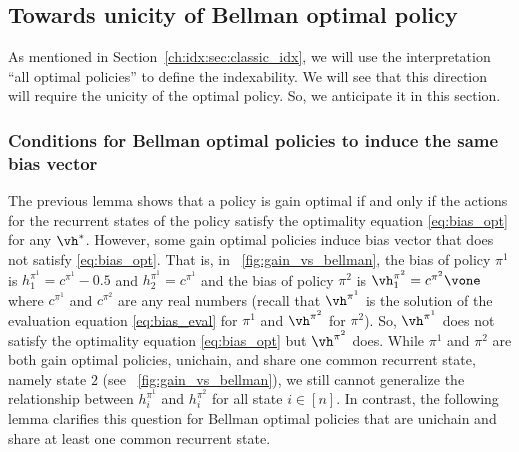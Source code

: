 \subsection{Towards unicity of Bellman optimal policy}
\label{ch:idx:ssec:prop_bell_opt}

As mentioned in Section~\ref{ch:idx:sec:classic_idx}, we will use the interpretation ``all optimal policies'' to define the indexability.
We will see that this direction will require the unicity of the optimal policy.
So, we anticipate it in this section.

\subsubsection{Conditions for Bellman optimal policies to induce the same bias vector}

The previous lemma shows that a policy is gain optimal if and only if the actions for the recurrent states of the policy satisfy the optimality equation \eqref{eq:bias_opt} for any $\vh^*$.
However, some gain optimal policies induce bias vector that does not satisfy \eqref{eq:bias_opt}.
That is, in \figurename~\ref{fig:gain_vs_bellman}, the bias of policy $\pi^1$ is $h^{\pi^1}_1=c^{\pi^1}-0.5$ and $h^{\pi^1}_2=c^{\pi^1}$ and the bias of policy $\pi^2$ is $\vh^{\pi^2}_1=c^{\pi^2}\vone$ where $c^{\pi^1}$ and $c^{\pi^2}$ are any real numbers (recall that $\vh^{\pi^1}$ is the solution of the evaluation equation \eqref{eq:bias_eval} for $\pi^1$ and $\vh^{\pi^2}$ for $\pi^2$).
So, $\vh^{\pi^1}$ does not satisfy the optimality equation \eqref{eq:bias_opt} but $\vh^{\pi^2}$ does.
While $\pi^1$ and $\pi^2$ are both gain optimal policies, unichain, and share one common recurrent state, namely state $2$ (see \figurename~\ref{fig:gain_vs_bellman}), we still cannot generalize the relationship between $h^{\pi^1}_i$ and $h^{\pi^2}_i$ for all state $i\in[n]$.
In contrast, the following lemma clarifies this question for Bellman optimal policies that are unichain and share at least one common recurrent state.

